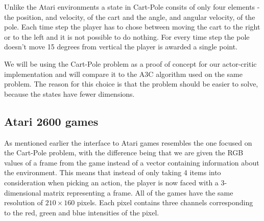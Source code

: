 \documentclass[11pt]{article}
\begin{document}
Unlike the Atari environments a state in Cart-Pole consits of only four elements - the position, and velocity, of the cart and the
angle, and angular velocity, of the pole.
Each time step the player has to chose between moving the cart to the right or to the left and it is not possible
to do nothing.
For every time step the pole doesn't move 15 degrees from vertical the player is awarded a single point.

We will be using the Cart-Pole problem as a proof of concept for our actor-critic implementation and will
compare it to the A3C algorithm used on the same problem.
The reason for this choice is that the problem should be easier to solve, because the
states have fewer dimensions.


\subsection{Atari 2600 games}

As mentioned earlier the interface to Atari games resembles the one focused on the Cart-Pole problem,
with the difference being that we are given the RGB values of a frame from the game
instead of a vector containing information about the environment.
This means that instead of only taking 4 items into consideration when picking an action,
the player is now faced with a 3-dimensional matrix representing a frame.
All of the games have the same resolution of $210 \times 160$ pixels.
Each pixel contains three channels corresponding to the red, green and blue intensities of the pixel.
\end{document}
